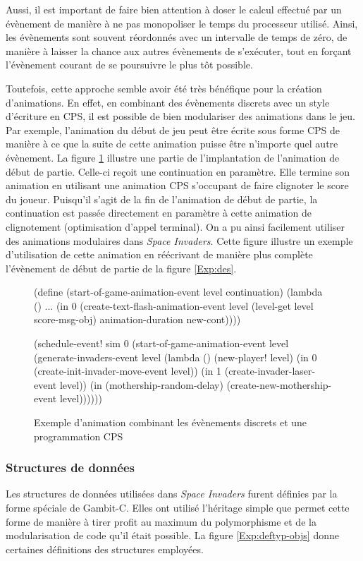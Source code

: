 \documentclass[12pt,twoside,letterpaper,francais]{book}
\newcommand{\scheme}[1]{\selectlanguage{english}{\tt #1}\selectlanguage{french}}
\begin{document}
Aussi, il est important de faire bien attention à doser le calcul
effectué par un évènement de manière à ne pas monopoliser le temps du
processeur utilisé. Ainsi, les évènements sont souvent réordonnés avec
un intervalle de temps de zéro, de manière à laisser la chance aux
autres évènements de s'exécuter, tout en forçant l'évènement courant
de se poursuivre le plus tôt possible.

Toutefois, cette approche semble avoir été très bénéfique pour la
création d'animations. En effet, en combinant des évènements discrets
avec un style d'écriture en CPS, il est possible de bien modulariser
des animations dans le jeu. Par exemple, l'animation du début de jeu
peut être écrite sous forme CPS de manière à ce que la suite de cette
animation puisse être n'importe quel autre évènement. La figure
\ref{Exp:anim} illustre une partie de l'implantation de l'animation de
début de partie. Celle-ci reçoit une continuation en paramètre. Elle
termine son animation en utilisant une animation CPS s'occupant de
faire clignoter le score du joueur. Puisqu'il s'agit de la fin de
l'animation de début de partie, la continuation est passée directement
en paramètre à cette animation de clignotement (optimisation d'appel
terminal). On a pu ainsi facilement utiliser des animations modulaires
dans \textit{Space Invaders}. Cette figure illustre un exemple d'utilisation de cette
animation en réécrivant de manière plus complète l'évènement de début
de partie de la figure \ref{Exp:des}.\\

\begin{figure}[htb!]
  \begin{schemecode}
(define (start-of-game-animation-event level continuation)
  (lambda ()
    ...
    (in 0 (create-text-flash-animation-event level
            (level-get level score-msg-obj)
            animation-duration new-cont))))

(schedule-event! sim 0
  (start-of-game-animation-event level
    (generate-invaders-event level
      (lambda ()
        (new-player! level)
        (in 0 (create-init-invader-move-event level))
        (in 1 (create-invader-laser-event level))
        (in (mothership-random-delay)
            (create-new-mothership-event level))))))
  \end{schemecode}
  \caption{Exemple d'animation combinant les évènements discrets et
    une programmation CPS}
  \label{Exp:anim}
\end{figure}


\FloatBarrier
\subsubsection{Structures de données}
Les structures de données utilisées dans \textit{Space Invaders} furent définies par la
forme spéciale \scheme{define-type} de Gambit-C. Elles ont utilisé
l'héritage simple que permet cette forme de manière à tirer profit au
maximum du polymorphisme et de la modularisation de code qu'il était
possible. La figure \ref{Exp:deftyp-objs} donne certaines définitions
des structures employées.\\
\end{document}
